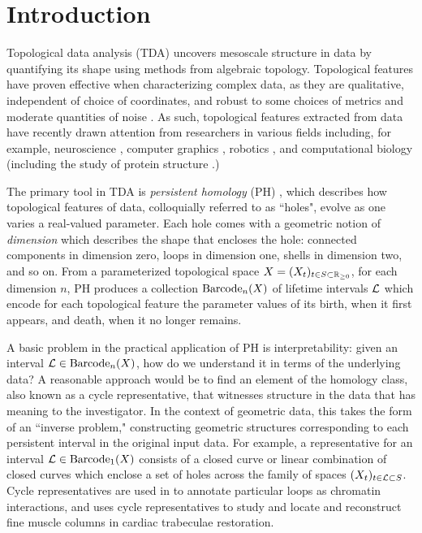 
\section{Introduction}
\label{intro}

Topological data analysis (TDA) uncovers 
mesoscale structure in data by quantifying its shape using methods from algebraic topology. 
Topological features have proven effective when characterizing complex data, as they are qualitative, independent of choice of coordinates, and robust to some choices of metrics and moderate quantities of noise \cite{ghrist2014elementary,Carlsson2009TopologyAD}. 
As such, topological features extracted from data have recently drawn attention from researchers in various fields including, for example, neuroscience \cite{giusti2016two, bendich2016persistent, robert}, computer graphics \cite{pointcloud-topo, singh2007topological}, robotics \cite{pathplanning, VASUDEVAN20113292},  and computational biology \cite{collectivemotion, selectingbiologicalexperiments/journal.pone.0213679, zebrafish} (including the study of protein structure   \cite{ Usingpersistenthomologyanddynamicaldistancestoanalyzeproteinbinding,xia2016multiscale,xia2014persistent}.)  

The primary tool in TDA is \textit{persistent homology} (PH) \cite{Ghrist08}, which describes how topological features of data, colloquially referred to as ``holes", evolve as one varies a real-valued parameter. Each hole comes with a geometric notion of  \emph{dimension} which describes the shape that encloses the hole: connected components in dimension zero, loops in dimension one, shells in dimension two, and so on. From a parameterized topological space $X = (X_t)_{t \in S \subset \mathbb{R}_{\ge 0}}$, for each dimension $n$, PH produces a collection $\mathrm{Barcode}_n(X)$ of lifetime intervals $\mathcal{L}$ which encode for each topological feature the parameter values of its birth, when it first appears, and death, when it no longer remains.

A basic problem in the practical application of PH is interpretability: given an interval $\mathcal{L} \in \mathrm{Barcode}_n(X)$, how do we understand it in terms of the underlying data? A reasonable approach would be to find an element of the homology class, also known as a cycle representative, that  witnesses structure in the data that has meaning to the investigator. In the context of geometric data, this takes the form of an ``inverse problem,"  constructing  geometric structures corresponding to each persistent interval in the original input data.
For example, a representative for an interval $\mathcal{L} \in \mathrm{Barcode}_1(X)$ consists of a closed curve or linear combination of closed curves which enclose a set of holes across the family of spaces $(X_t)_{t \in \mathcal{L} \subset S}$. Cycle representatives are used in \cite{emmett2015multiscale} to annotate particular loops as chromatin interactions, and  \cite{wu} uses cycle representatives to study and locate and reconstruct fine muscle columns in  cardiac trabeculae restoration.

